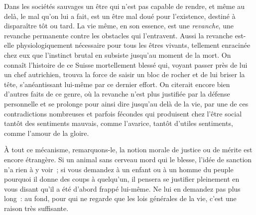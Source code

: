 \documentclass[french,twoside]{book} %
\begin{document}
Dans les sociétés sauvages un être qui n’est pas capable de rendre, et même au delà, le mal qu’on lui a fait, est un être mal doué pour l’existence, destiné à disparaître tôt ou tard. La vie même, en son essence, est une \emph{revanche}, une revanche permanente contre les obstacles qui l’entravent. Aussi la revanche est-elle physiologiquement nécessaire pour tous les êtres vivants, tellement enracinée chez eux que l’instinct brutal en subsiste jusqu’au moment de la mort. On connaît l’histoire de ce Suisse mortellement blessé qui, voyant passer près de lui un chef autrichien, trouva la force de saisir un bloc de rocher et de lui briser la tête, s’anéantissant lui-même par ce dernier effort. On citerait encore bien d’autres faits de ce genre, où la revanche n’est plus justifiée par la défense personnelle et se prolonge pour ainsi dire jusqu’au delà de la vie, par une de ces contradictions nombreuses et parfois fécondes qui produisent chez l’être social tantôt des sentiments mauvais, comme l’avarice, tantôt d’utiles sentiments, comme l’amour de la gloire.\par
À tout ce mécanisme, remarquons-le, la notion morale de justice ou de mérite est encore étrangère. Si un animal sans cerveau mord qui le blesse, l’idée de sanction n’a rien à y voir ; si vous demandez à un enfant ou à un homme du peuple pourquoi il donne des coups à quelqu’un, il pensera se justifier pleinement en vous disant qu’il a été d’abord frappé lui-même. Ne lui en demandez pas plus long : au fond, pour qui ne regarde que les lois générales de la vie, c’est une raison très suffisante.\par
\end{document}
